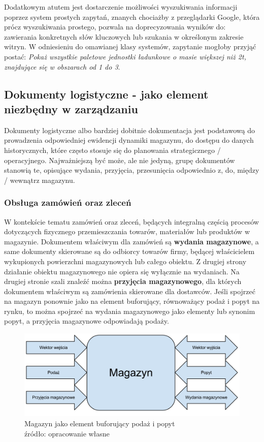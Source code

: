 		Dodatkowym atutem jest dostarczenie możliwości wyszukiwania informacji poprzez system prostych zapytań, 
		znanych chociażby z przeglądarki Google, która prócz wyszukiwania prostego, pozwala na doprecyzowania
		wyników do: zawierania konkretnych słów kluczowych lub szukania w określonym zakresie witryn. W odniesieniu
		do omawianej klasy systemów, zapytanie mogłoby przyjąć postać: \emph{Pokaż wszystkie paletowe jednostki
		ładunkowe o masie większej niż 2t, znajdujące się w obszarach od 1 do 3}. 
%
%
	\subsection{Dokumenty logistyczne - jako element niezbędny w zarządzaniu}
		Dokumenty logistyczne albo bardziej dobitnie dokumentacja jest podstawową do prowadzenia odpowiedniej
		ewidencji dynamiki magazynu, do dostępu do danych historycznych, które często stosuje się
		do planowania strategicznego / operacyjnego. Najważniejszą być może, ale nie jedyną, grupę dokumentów
		stanowią te, opisujące wydania, przyjęcia, przesunięcia odpowiednio z, do, między / wewnątrz magazynu.
	\subsubsection{Obsługa zamówień oraz zleceń}
		W kontekście tematu zamówień oraz zleceń, będących integralną częścią procesów dotyczących fizycznego
		przemieszczania towarów, materiałów lub produktów w magazynie. Dokumentem właściwym dla zamówień są
		\textbf{wydania magazynowe}, a same dokumenty skierowane są do odbiorcy towarów firmy, będącej właścicielem
		wykupionych powierzchni magazynowych lub całego obiektu. Z drugiej strony działanie obiektu magazynowego
		nie opiera się wyłącznie na wydaniach. Na drugiej stronie szali znaleźć można \textbf{przyjęcia magazynowego},
		dla których dokumentem właściwym są zamówienia skierowane dla dostawców. Jeśli spojrzeć na magazyn ponownie jako
		na element buforujący, równoważący podaż i popyt na rynku, to można spojrzeć na wydania magazynowego jako
		elementy lub synonim popyt, a przyjęcia magazynowe odpowiadają podaży. 
		
		\begin{figure}[H]
			\centering
			\includegraphics[width=\textwidth]{images/warehouse_buffer}
			\caption[Magazyn jako bufor]{
				Magazyn jako element buforujący podaż i popyt\\
				źródło: opracowanie własne
			}
		\end{figure}
		
